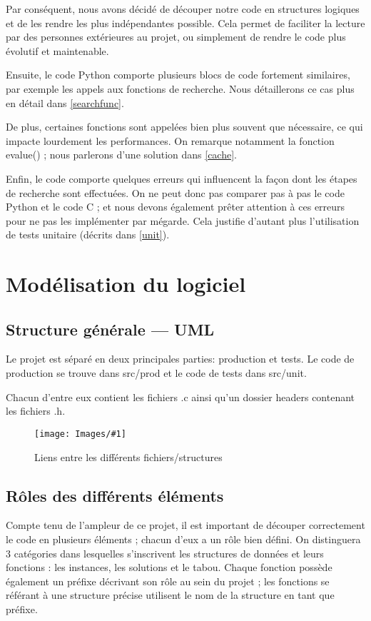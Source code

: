\documentclass[hideweeklyreports]{polytech/polytech}
\newcommand{\img}[3]{%
	\begin{figure}[H]
		\centering
   		\texttt{[image: Images/\#1]}
  	 	\caption{#2}
	\end{figure}
}
\begin{document}
			Par conséquent, nous avons décidé de découper notre code en structures logiques et de les rendre les plus indépendantes possible. Cela permet de faciliter la lecture par des personnes extérieures au projet, ou simplement de rendre le code plus évolutif et maintenable.
			
			Ensuite, le code Python comporte plusieurs blocs de code fortement similaires, par exemple les appels aux fonctions de recherche. Nous détaillerons ce cas plus en détail dans \autoref{searchfunc}.
			
			De plus, certaines fonctions sont appelées bien plus souvent que nécessaire, ce qui impacte lourdement les performances. On remarque notamment la fonction evalue() ; nous parlerons d'une solution dans \autoref{cache}.
			
			Enfin, le code comporte quelques erreurs qui influencent la façon dont les étapes de recherche sont effectuées. On ne peut donc pas comparer pas à pas le code Python et le code C ; et nous devons également prêter attention à ces erreurs pour ne pas les implémenter par mégarde. Cela justifie d'autant plus l'utilisation de tests unitaire (décrits dans \autoref{unit}).
			
		
	\chapter{Modélisation du logiciel} %
		\section{Structure générale — UML}
			Le projet est séparé en deux principales parties: production et tests.
			Le code de production se trouve dans src/prod et le code de tests dans src/unit.
			
			Chacun d'entre eux contient les fichiers .c ainsi qu'un dossier headers contenant les fichiers .h.
			
			\img{UML.png}{Liens entre les différents fichiers/structures}{0.45}

		\section{Rôles des différents éléments}
			Compte tenu de l'ampleur de ce projet, il est important de découper correctement le code en plusieurs éléments ; chacun d'eux a un rôle bien défini. On distinguera 3 catégories dans lesquelles s'inscrivent les structures de données et leurs fonctions : les instances, les solutions et le tabou. Chaque fonction possède également un préfixe décrivant
son rôle au sein du projet ; les fonctions se référant à une structure précise utilisent le nom de la structure en tant que préfixe.			
\end{document}
